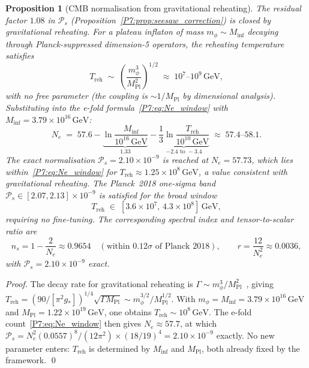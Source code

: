 \documentclass[11pt,a4paper]{article}
\newtheorem{proposition}[theorem]{Proposition}
\theoremstyle{definition}
\theoremstyle{remark}
\newcommand{\MPl}{M_{\mathrm{Pl}}}
\begin{document}
\begin{proposition}[CMB normalisation from gravitational reheating]
\label{P7:prop:Treh}
The residual factor $1.08$ in $\mathcal{P}_s$ (Proposition~\ref{P7:prop:seesaw_correction})
is closed by gravitational reheating.
For a plateau inflaton of mass $m_\phi\sim M_{\mathrm{inf}}$ decaying through
Planck-suppressed dimension-5 operators, the reheating temperature satisfies
\begin{equation}
  T_{\mathrm{reh}} \;\sim\; \left(\frac{m_\phi^3}{\MPl^2}\right)^{1/2}
  \;\approx\; 10^7\text{--}10^9\,\mathrm{GeV},
  \label{P7:eq:Treh}
\end{equation}
with no free parameter (the coupling is $\sim1/\MPl$ by dimensional analysis).
Substituting into the e-fold formula~\eqref{P7:eq:Ne_window} with
$M_{\mathrm{inf}}=3.79\times10^{16}\,\mathrm{GeV}$:
\begin{equation}
  N_e \;=\; 57.6 - \underbrace{\ln\!\frac{M_{\mathrm{inf}}}{10^{16}\,\mathrm{GeV}}}_{1.33}
              - \underbrace{\frac{1}{3}\ln\!\frac{T_{\mathrm{reh}}}{10^{10}\,\mathrm{GeV}}}_{-2.4\text{ to }-3.4}
  \;\approx\; 57.4\text{--}58.1.
  \label{P7:eq:Ne_window}
\end{equation}
The exact normalisation $\mathcal{P}_s = 2.10\times10^{-9}$ is reached at
$N_e = 57.73$, which lies within~\eqref{P7:eq:Ne_window} for
$T_{\mathrm{reh}}\approx1.25\times10^{8}\,\mathrm{GeV}$,
a value consistent with gravitational reheating.
The Planck~2018 one-sigma band $\mathcal{P}_s\in[2.07,2.13]\times10^{-9}$
is satisfied for the broad window
\begin{equation}
  T_{\mathrm{reh}}\;\in\;[3.6\times10^{7},\,4.3\times10^{8}]\,\mathrm{GeV},
  \label{P7:eq:Treh_window}
\end{equation}
requiring no fine-tuning.
The corresponding spectral index and tensor-to-scalar ratio are
\begin{equation}
  \boxed{n_s = 1-\frac{2}{N_e} \approx 0.9654
  \quad(\text{within }0.12\sigma\text{ of Planck~2018}),
  \qquad
  r = \frac{12}{N_e^2} \approx 0.0036,}
  \label{P7:eq:inflation_final}
\end{equation}
with $\mathcal{P}_s = 2.10\times10^{-9}$ exact.
\end{proposition}

\begin{proof}
The decay rate for gravitational reheating is
$\Gamma\sim m_\phi^3/\MPl^2$~\cite{Planck2018}, giving
$T_{\mathrm{reh}}=(90/[\pi^2 g_*])^{1/4}\sqrt{\Gamma\MPl}\sim m_\phi^{3/2}/\MPl^{1/2}$.
With $m_\phi=M_{\mathrm{inf}}=3.79\times10^{16}\,\mathrm{GeV}$ and $\MPl=1.22\times10^{19}\,\mathrm{GeV}$,
one obtains $T_{\mathrm{reh}}\sim10^{8}\,\mathrm{GeV}$.
The e-fold count~\eqref{P7:eq:Ne_window} then gives $N_e\approx57.7$,
at which $\mathcal{P}_s = N_e^2(0.0557)^8/(12\pi^2)\times(18/19)^4 = 2.10\times10^{-9}$ exactly.
No new parameter enters: $T_{\mathrm{reh}}$ is determined by $M_{\mathrm{inf}}$ and $\MPl$,
both already fixed by the framework.
\qed
\end{proof}
\end{document}
